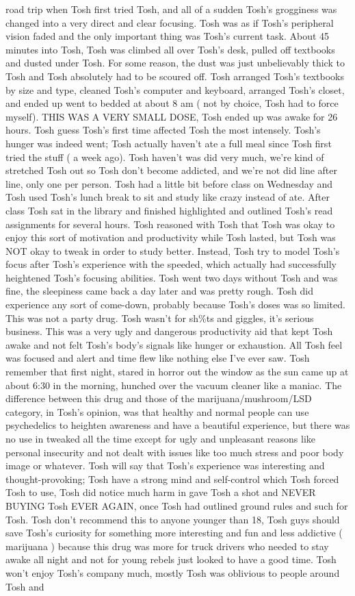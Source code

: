 \documentclass[12pt]{book}
\begin{document}
road trip when Tosh first tried Tosh, and all of a sudden Tosh's grogginess was changed into a very direct and clear focusing. Tosh was as if Tosh's peripheral vision faded and the only important thing was Tosh's current task. About 45 minutes into Tosh, Tosh was climbed all over Tosh's desk, pulled off textbooks and dusted under Tosh. For some reason, the dust was just unbelievably thick to Tosh and Tosh absolutely had to be scoured off. Tosh arranged Tosh's textbooks by size and type, cleaned Tosh's computer and keyboard, arranged Tosh's closet, and ended up went to bedded at about 8 am ( not by choice, Tosh had to force myself). THIS WAS A VERY SMALL DOSE, Tosh ended up was awake for 26 hours. Tosh guess Tosh's first time affected Tosh the most intensely. Tosh's hunger was indeed went; Tosh actually haven't ate a full meal since Tosh first tried the stuff ( a week ago). Tosh haven't was did very much, we're kind of stretched Tosh out so Tosh don't become addicted, and we're not did line after line, only one per person. Tosh had a little bit before class on Wednesday and Tosh used Tosh's lunch break to sit and study like crazy instead of ate. After class Tosh sat in the library and finished highlighted and outlined Tosh's read assignments for several hours. Tosh reasoned with Tosh that Tosh was okay to enjoy this sort of motivation and productivity while Tosh lasted, but Tosh was NOT okay to tweak in order to study better. Instead, Tosh try to model Tosh's focus after Tosh's experience with the speeded, which actually had successfully heightened Tosh's focusing abilities. Tosh went two days without Tosh and was fine, the sleepiness came back a day later and was pretty rough. Tosh did experience any sort of come-down, probably because Tosh's doses was so limited. This was not a party drug. Tosh wasn't for sh\%ts and giggles, it's serious business. This was a very ugly and dangerous productivity aid that kept Tosh awake and not felt Tosh's body's signals like hunger or exhaustion. All Tosh feel was focused and alert and time flew like nothing else I've ever saw. Tosh remember that first night, stared in horror out the window as the sun came up at about 6:30 in the morning, hunched over the vacuum cleaner like a maniac. The difference between this drug and those of the marijuana/mushroom/LSD category, in Tosh's opinion, was that healthy and normal people can use psychedelics to heighten awareness and have a beautiful experience, but there was no use in tweaked all the time except for ugly and unpleasant reasons like personal insecurity and not dealt with issues like too much stress and poor body image or whatever. Tosh will say that Tosh's experience was interesting and thought-provoking; Tosh have a strong mind and self-control which Tosh forced Tosh to use, Tosh did notice much harm in gave Tosh a shot and NEVER BUYING Tosh EVER AGAIN, once Tosh had outlined ground rules and such for Tosh. Tosh don't recommend this to anyone younger than 18, Tosh guys should save Tosh's curiosity for something more interesting and fun and less addictive ( marijuana ) because this drug was more for truck drivers who needed to stay awake all night and not for young rebels just looked to have a good time. Tosh won't enjoy Tosh's company much, mostly Tosh was oblivious to people around Tosh and 
\end{document}
